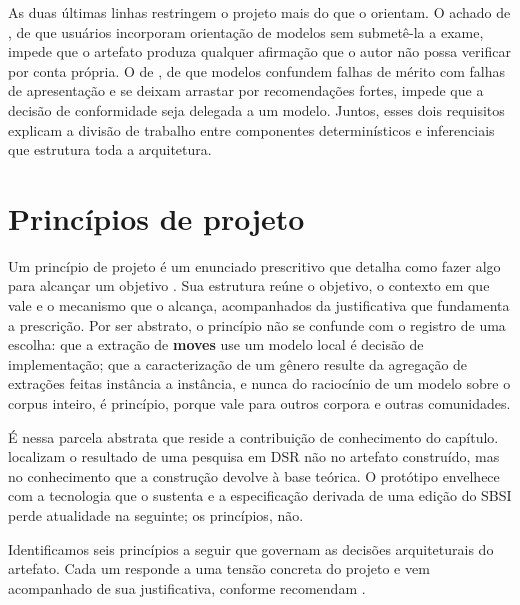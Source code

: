 As duas últimas linhas restringem o projeto mais do que o orientam. O achado de , de que usuários incorporam orientação de modelos sem submetê-la a exame, impede que o artefato produza qualquer afirmação que o autor não possa verificar por conta própria. O de , de que modelos confundem falhas de mérito com falhas de apresentação e se deixam arrastar por recomendações fortes, impede que a decisão de conformidade seja delegada a um modelo. Juntos, esses dois requisitos explicam a divisão de trabalho entre componentes determinísticos e inferenciais que estrutura toda a arquitetura.


\section{Princípios de projeto}
\label{sec:principios}


Um princípio de projeto é um enunciado prescritivo que detalha como fazer algo para alcançar um objetivo \cite{AnatomyDesignPrinciple}. Sua estrutura reúne o objetivo, o contexto em que vale e o mecanismo que o alcança, acompanhados da justificativa que fundamenta a prescrição. Por ser abstrato, o princípio não se confunde com o registro de uma escolha: que a extração de \textbf{moves} use um modelo local é decisão de implementação; que a caracterização de um gênero resulte da agregação de extrações feitas instância a instância, e nunca do raciocínio de um modelo sobre o corpus inteiro, é princípio, porque vale para outros corpora e outras comunidades.

É nessa parcela abstrata que reside a contribuição de conhecimento do capítulo.  localizam o resultado de uma pesquisa em DSR não no artefato construído, mas no conhecimento que a construção devolve à base teórica. O protótipo envelhece com a tecnologia que o sustenta e a especificação derivada de uma edição do SBSI perde atualidade na seguinte; os princípios, não.

Identificamos seis princípios a seguir que governam as decisões arquiteturais do artefato. Cada um responde a
uma tensão concreta do projeto e vem acompanhado de sua justificativa, conforme recomendam \cite{AnatomyDesignPrinciple}.



